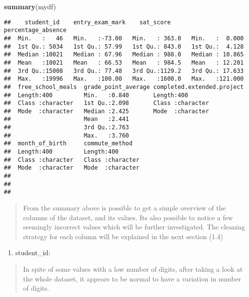 \documentclass[
]{article}
\newenvironment{Shaded}{\begin{snugshade}}{\end{snugshade}}
\newcommand{\FunctionTok}[1]{\textcolor[rgb]{0.13,0.29,0.53}{\textbf{#1}}}
\newcommand{\NormalTok}[1]{#1}
\providecommand{\tightlist}{%
  \setlength{\itemsep}{0pt}\setlength{\parskip}{0pt}}
\begin{document}
\begin{Shaded}
\begin{Highlighting}[]
\FunctionTok{summary}\NormalTok{(mydf)}
\end{Highlighting}
\end{Shaded}

\begin{verbatim}
##    student_id    entry_exam_mark    sat_score      percentage_absence
##  Min.   :   46   Min.   :-73.00   Min.   : 363.0   Min.   :  0.000   
##  1st Qu.: 5034   1st Qu.: 57.99   1st Qu.: 843.0   1st Qu.:  4.128   
##  Median :10021   Median : 67.96   Median : 988.0   Median : 10.865   
##  Mean   :10021   Mean   : 66.53   Mean   : 984.5   Mean   : 12.201   
##  3rd Qu.:15008   3rd Qu.: 77.48   3rd Qu.:1129.2   3rd Qu.: 17.633   
##  Max.   :19996   Max.   :100.00   Max.   :1600.0   Max.   :121.000   
##  free_school_meals  grade_point_average completed.extended.project
##  Length:400         Min.   :0.840       Length:400                
##  Class :character   1st Qu.:2.098       Class :character          
##  Mode  :character   Median :2.425       Mode  :character          
##                     Mean   :2.441                                 
##                     3rd Qu.:2.763                                 
##                     Max.   :3.760                                 
##  month_of_birth     commute_method    
##  Length:400         Length:400        
##  Class :character   Class :character  
##  Mode  :character   Mode  :character  
##                                       
##                                       
## 
\end{verbatim}

\begin{quote}
From the summary above is possible to get a simple overview of the
columns of the dataset, and its values. Its also possible to notice a
few seemingly incorrect values which will be further investigated. The
cleaning strategy for each column will be explained in the next section
(1.4)
\end{quote}

\begin{enumerate}
\def\labelenumi{\arabic{enumi}.}
\tightlist
\item
  student\_id:
\end{enumerate}

\begin{quote}
In spite of some values with a low number of digits, after taking a look
at the whole dataset, it appears to be normal to have a variation in
number of digits.
\end{quote}
\end{document}
